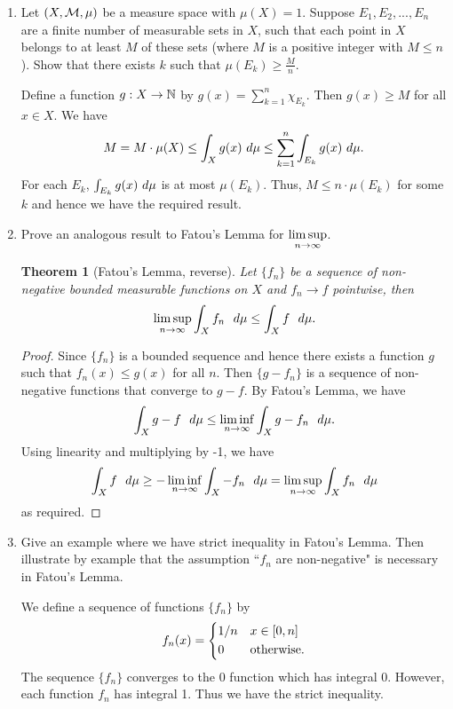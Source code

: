 \documentclass[12pt]{article}
\newtheorem{thm}{Theorem}
\begin{document}
\begin{enumerate}
    \item Let $(X, \mathcal{M}, \mu)$ be a measure space with $\mu(X) =1$. Suppose $E_1, E_2, ..., E_n$ are a finite number of measurable sets in $X$, such that each point in $X$ belongs to at least $M$ of these sets (where $M$ is a positive integer with $M \leq n$). Show that there exists $k$ such that $\mu(E_k) \geq \frac{M}{n}$.
    
    \begin{mybox}
        Define a function $g:X\to\mathbb{N}$ by $g(x)=\sum_{k=1}^{n}{\chi_{E_k}}$.
        Then $g(x)\geq M$ for all $x\in X$. We have
        $$M=M\cdot\mu(X)\leq \int_{X}{g(x)\ d\mu}\leq \sum_{k=1}^{n}
        {\int_{E_k}{g(x)\ d\mu}}.$$
        For each $E_k$, $\int_{E_k}{g(x)\ d\mu}$ is at most $\mu(E_k)$. Thus,
        $M\leq n\cdot\mu(E_k)$ for some $k$ and hence we have the required
        result.
    \end{mybox}

    \item Prove an analogous result to Fatou's Lemma for $\displaystyle \limsup_{n \to \infty}$. 
    
    \begin{mybox}
        \begin{thm}[Fatou's Lemma, reverse]
            Let $\{f_n\}$ be a sequence of non-negative 
            bounded measurable functions
            on $X$ and $f_n \to f$ pointwise, then
            $$\lsn{\int_X{f_n\ \dmu}}\leq\int_X{f\ \dmu}.$$
        \end{thm}
        \begin{proof}
            Since $\{f_n\}$ is a bounded
            sequence and hence there exists a function $g$ such that 
            $f_n(x)\leq g(x)$ for all $n$. Then $\{g-f_n\}$ is a sequence of
            non-negative functions that converge to $g-f$. By Fatou's Lemma,
            we have
            $$\int_X{g-f\ \dmu}\leq \lin\int_X{g-f_n\ \dmu}.$$
            Using linearity and multiplying by -1, we have
            $$\int_X{f\ \dmu}\geq -\lin\int_X{-f_n\ \dmu}=\lsn\int_X{f_n\ \dmu}$$
            as required.
        \end{proof}
    \end{mybox}

    \item Give an example where we have strict inequality in Fatou's Lemma. Then illustrate by example that the assumption ``$f_n$ are non-negative" is necessary in Fatou's Lemma. 
    
    \begin{mybox}
        We define a sequence of functions $\{f_n\}$ by
        $$f_n(x)=
        \begin{dcases}
            1/n &x\in [0,n]\\
            0 &\text{otherwise.}
        \end{dcases}$$
        The sequence $\{f_n\}$ converges to the 0 function which has integral
        0. However, each function $f_n$ has integral 1. Thus we have the
        strict inequality.


\end{mybox}
\end{enumerate}
\end{document}
